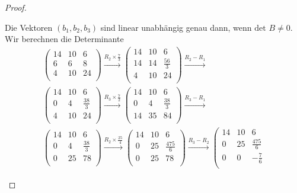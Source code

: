 \begin{proof}
	\begin{parts}
	\item Die Vektoren $(b_1,b_2,b_3)$ sind linear unabhängig genau dann, wenn $\text{det }B\neq 0$. Wir berechnen die Determinante
		\begin{gather*}
		\left(
\begin{array}{ccc}
 14 & 10 & 6 \\
 6 & 6 & 8 \\
 4 & 10 & 24 \\
\end{array}
\right) \xrightarrow{R_2\times \frac{7}{3}} \left(
\begin{array}{ccc}
 14 & 10 & 6 \\
 14 & 14 & \frac{56}{3} \\
 4 & 10 & 24 \\
\end{array}
\right) \xrightarrow{R_2-R_1} \\\left(
\begin{array}{ccc}
 14 & 10 & 6 \\
 0 & 4 & \frac{38}{3} \\
 4 & 10 & 24 \\
\end{array}
\right) \xrightarrow{R_3\times \frac{7}{2}} \left(
\begin{array}{ccc}
 14 & 10 & 6 \\
 0 & 4 & \frac{38}{3} \\
 14 & 35 & 84 \\
\end{array}
\right) \xrightarrow{R_3-R_1} \\\left(
\begin{array}{ccc}
 14 & 10 & 6 \\
 0 & 4 & \frac{38}{3} \\
 0 & 25 & 78 \\
\end{array}
\right) \xrightarrow{R_2\times \frac{25}{4}} \left(
\begin{array}{ccc}
 14 & 10 & 6 \\
 0 & 25 & \frac{475}{6} \\
 0 & 25 & 78 \\
\end{array}
\right) \xrightarrow{R_3-R_2} \left(
\begin{array}{ccc}
 14 & 10 & 6 \\
 0 & 25 & \frac{475}{6} \\
 0 & 0 & -\frac{7}{6} \\

\end{array}
\end{gather*}
\end{parts}
\end{proof}
